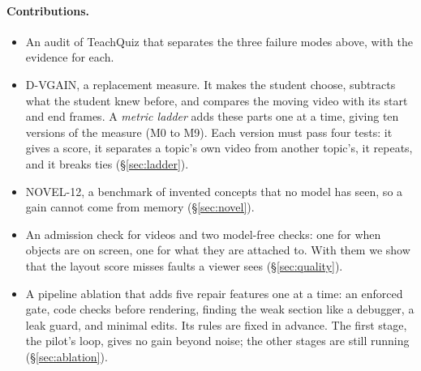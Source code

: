 \paragraph{Contributions.}
\begin{itemize}
  \item An audit of TeachQuiz that separates the three failure modes above, with the evidence for each.
  \item D-VGAIN, a replacement measure. It makes the student choose, subtracts what the student knew before, and
  compares the moving video with its start and end frames. A \emph{metric ladder} adds these parts one at a time, giving ten
  versions of the measure (M0 to M9). Each version must pass four tests: it gives a score, it separates a topic's own video from another topic's, it repeats, and it
  breaks ties (\S\ref{sec:ladder}).
  \item NOVEL-12, a benchmark of invented concepts that no model has seen, so a gain cannot come from memory
  (\S\ref{sec:novel}).
  \item An admission check for videos and two model-free checks: one for when objects are on screen, one for what
  they are attached to. With them we show that the layout score misses faults a viewer sees (\S\ref{sec:quality}).
  \item A pipeline ablation that adds five repair features one at a time: an enforced gate, code checks before
  rendering, finding the weak section like a debugger, a leak guard, and minimal edits. Its rules are fixed in
  advance. The first stage, the pilot's loop, gives no gain beyond noise; the other stages are still running
  (\S\ref{sec:ablation}).
\end{itemize}
